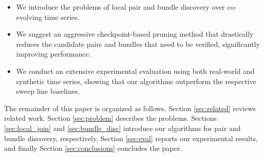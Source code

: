 \begin{itemize} 
 \item We introduce the problems of local pair and bundle discovery over co-evolving time series.
 \item We suggest an aggressive checkpoint-based pruning method that drastically reduces the candidate pairs and bundles that need to be verified, significantly improving performance.
 \item We conduct an extensive experimental evaluation using both real-world and synthetic time series, showing that our algorithms outperform the respective sweep line baselines.
\end{itemize}

The remainder of this paper is organized as follows. Section \ref{sec:related} reviews related work. Section \ref{sec:problem} describes the problems. Sections \ref{sec:local_join} and \ref{sec:bundle_disc} introduce our algorithms for pair and bundle discovery, respectively. Section \ref{sec:eval} reports our experimental results, and finally Section \ref{sec:conclusions} concludes the paper.


